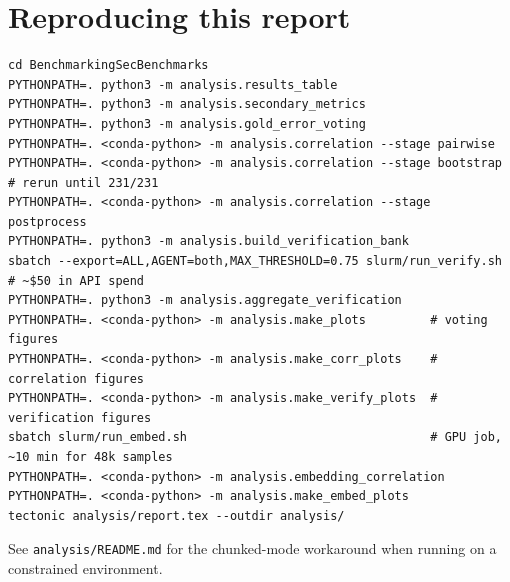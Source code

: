 \documentclass[10pt,a4paper]{article}
\begin{document}
\section*{Reproducing this report}

\begin{verbatim}
cd BenchmarkingSecBenchmarks
PYTHONPATH=. python3 -m analysis.results_table
PYTHONPATH=. python3 -m analysis.secondary_metrics
PYTHONPATH=. python3 -m analysis.gold_error_voting
PYTHONPATH=. <conda-python> -m analysis.correlation --stage pairwise
PYTHONPATH=. <conda-python> -m analysis.correlation --stage bootstrap   # rerun until 231/231
PYTHONPATH=. <conda-python> -m analysis.correlation --stage postprocess
PYTHONPATH=. python3 -m analysis.build_verification_bank
sbatch --export=ALL,AGENT=both,MAX_THRESHOLD=0.75 slurm/run_verify.sh   # ~$50 in API spend
PYTHONPATH=. python3 -m analysis.aggregate_verification
PYTHONPATH=. <conda-python> -m analysis.make_plots         # voting figures
PYTHONPATH=. <conda-python> -m analysis.make_corr_plots    # correlation figures
PYTHONPATH=. <conda-python> -m analysis.make_verify_plots  # verification figures
sbatch slurm/run_embed.sh                                  # GPU job, ~10 min for 48k samples
PYTHONPATH=. <conda-python> -m analysis.embedding_correlation
PYTHONPATH=. <conda-python> -m analysis.make_embed_plots
tectonic analysis/report.tex --outdir analysis/
\end{verbatim}

\noindent See \texttt{analysis/README.md} for the chunked-mode workaround when running on a constrained environment.
\end{document}
